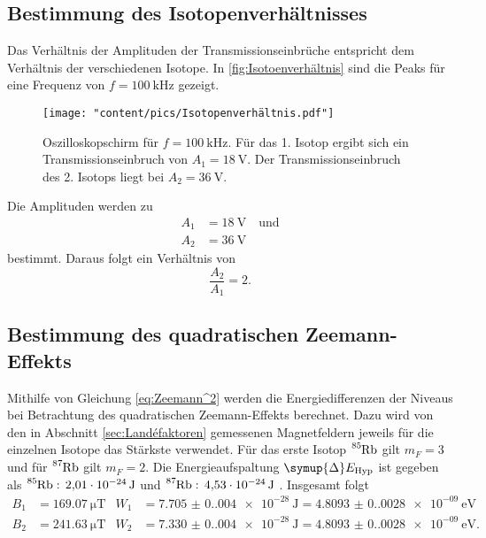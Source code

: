 \subsection{Bestimmung des Isotopenverhältnisses}
\label{sec:Isotoenverhältnis}
Das Verhältnis der Amplituden der Transmissionseinbrüche entspricht dem Verhältnis der verschiedenen Isotope. In \autoref{fig:Isotoenverhältnis} sind die Peaks
für eine Frequenz von $f=\qty{100}{\kilo\hertz}$ gezeigt.

\begin{figure}
  \centering
  \texttt{[image: "content/pics/Isotopenverhältnis.pdf"]}
  \caption{Oszilloskopschirm für $f=\qty{100}{\kilo\hertz}$. Für das 1. Isotop ergibt sich ein Transmissionseinbruch von $A_1=\qty{18}{\volt}$.
  Der Transmissionseinbruch des 2. Isotops liegt bei $A_2=\qty{36}{\volt}.$}
  \label{fig:Isotoenverhältnis}
\end{figure}
Die Amplituden werden zu 
\begin{align*}
  A_1 &= \qty{18}{\volt} \quad \text{und} \\
  A_2 &= \qty{36}{\volt}
\end{align*}
bestimmt. Daraus folgt ein Verhältnis von
\begin{equation*}
  \frac{A_2}{A_1} = \num{2}.
\end{equation*}

\subsection{Bestimmung des quadratischen Zeemann-Effekts}
Mithilfe von Gleichung \eqref{eq:Zeemann^2} werden die Energiedifferenzen der Niveaus bei Betrachtung des quadratischen Zeemann-Effekts berechnet. Dazu wird von
den in Abschnitt \ref{sec:Landéfaktoren} gemessenen Magnetfeldern jeweils für die einzelnen Isotope das Stärkste verwendet. Für das erste Isotop $\ce{^{85}Rb}$ gilt
$m_F=3$ und für $\ce{^{87}Rb}$ gilt $m_F=2$. Die Energieaufspaltung $\symup{\Delta}E_{\text{Hyp}}$ ist gegeben als $\ce{^{85}Rb}:\, \qty{2,01e-24}{\joule}$ und 
$\ce{^{87}Rb}:\, \qty{4,53e-24}{\joule}$ \cite{v21}. Insgesamt folgt
\begin{align*}
  B_1 &= \qty{169.07}{\micro\tesla} & W_1 &= \qty{7.705(0.004)e-28}{\joule} = \qty{4.8093(0.0028)e-09}{\electronvolt} \\
  B_2 &= \qty{241.63}{\micro\tesla} & W_2 &= \qty{7.330(0.004)e-28}{\joule} = \qty{4.8093(0.0028)e-09}{\electronvolt}. \\
\end{align*}

